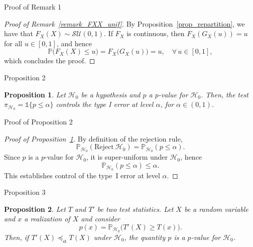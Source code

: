 \documentclass{beamer}
\newtheorem{proposition}{Proposition}
\begin{document}
\begin{frame}{Proof of Remark 1}
  \begin{proof}[Proof of Remark~\ref{remark_FXX_unif}]
    By Proposition~\ref{prop_repartition}, we have that $F_X(X) \sim \mathcal{SU}(0,1)$.
    If \(F_X\) is continuous, then \(F_X(G_X(u)) = u\) for all \(u\in[0,1]\), and hence
    \begin{equation*}
      \mathbb{P}\bigl(F_X(X)\le u\bigr)
      = F_X\bigl(G_X(u)\bigr)
      = u, \quad \forall\,u\in[0,1],
    \end{equation*}
    which concludes the proof.
  \end{proof}
\end{frame}

\begin{frame}{Proposition 2}
  \begin{proposition}\label{prop_rejection_rule}
    Let $\mathcal{H}_0$ be a hypothesis and $p$ a $p$-value for $\mathcal{H}_0$. Then, the test $\pi_{\mathcal{H}_0} = \mathds{1}{\{p \leq \alpha\}}$ controls the type I error at level $\alpha$, for $\alpha\in(0,1)$.
  \end{proposition}
\end{frame}

\begin{frame}{Proof of Proposition 2}
  \begin{proof}[Proof of Proposition~\ref{prop_rejection_rule}]
    By definition of the rejection rule,
    \begin{equation*}
      \mathbb{P}_{\mathcal{H}_0}(\text{Reject} ~ \mathcal{H}_0)
      = \mathbb{P}_{\mathcal{H}_0}(p \le \alpha).
    \end{equation*}
    Since \(p\) is a $p$-value for \(\mathcal{H}_0\), it is super-uniform under
    \(\mathcal{H}_0\), hence
    \begin{equation*}
      \mathbb{P}_{\mathcal{H}_0}(p \le \alpha) \le \alpha.
    \end{equation*}
    This establishes control of the type~I error at level \(\alpha\).
  \end{proof}
\end{frame}

\begin{frame}{Proposition 3}
  \begin{proposition}\label{prop_test_stat_pvalue}
    Let \(T\) and \(T'\) be two test statistics. Let \(X\) be a random variable and \(x\) a realization of \(X\) and consider
    \begin{equation*}
      p(x) = \mathbb{P}_{\mathcal{H}_0}\!\bigl(T'(X) \ge T(x)\bigr).
    \end{equation*}
    Then, if $T'(X) \preceq_{\mathrm{st}} T(X)$ under $\mathcal{H}_0$,
    the quantity \(p\) is a $p$-value for \(\mathcal{H}_0\).
  \end{proposition}
\end{frame}
\end{document}
